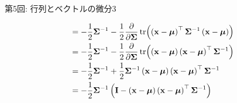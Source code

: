 \documentclass[dvipdfmx,notheorems,t]{beamer}
\begin{document}
\begin{frame}{第5回: 行列とベクトルの微分3}
\begin{enumerate}
\begin{align*}
    &= -\frac{1}{2} \vb{\Sigma}^{-1} - \frac{1}{2} \pdv{\vb{\Sigma}} \tr(
      \left( \vb{x} - \vb*{\mu} \right)^\top \vb{\Sigma}^{-1}
      \left( \vb{x} - \vb*{\mu} \right)) \\
    &= -\frac{1}{2} \vb{\Sigma}^{-1} - \frac{1}{2} \pdv{\vb{\Sigma}} \tr(
      \left( \vb{x} - \vb*{\mu} \right) \left( \vb{x} - \vb*{\mu} \right)^\top
      \vb{\Sigma}^{-1}) \\
    &= -\frac{1}{2} \vb{\Sigma}^{-1} + \frac{1}{2} \vb{\Sigma}^{-1}
      \left( \vb{x} - \vb*{\mu} \right) \left( \vb{x} - \vb*{\mu} \right)^\top
      \vb{\Sigma}^{-1} \\
    &= -\frac{1}{2} \vb{\Sigma}^{-1} \left( \vb{I}
      - \left( \vb{x} - \vb*{\mu} \right) \left( \vb{x} - \vb*{\mu} \right)^\top
      \vb{\Sigma}^{-1} \right)
  \end{align*}
\end{enumerate}
\end{frame}
\end{document}
